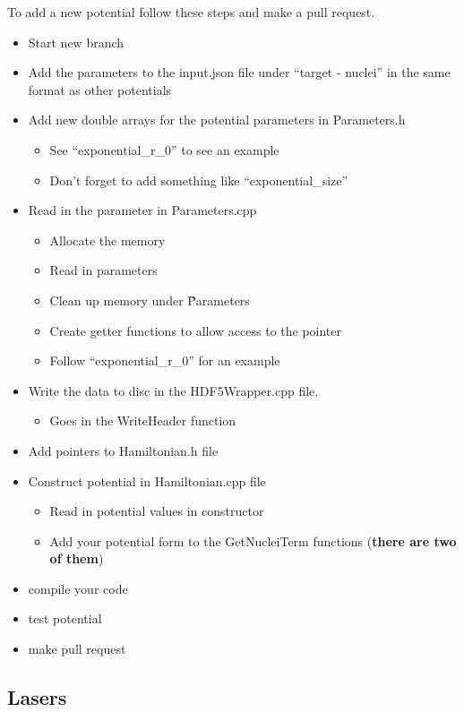 \documentclass{article}
\begin{document}
To add a new potential follow these steps and make a pull request.
\begin{itemize}
  \item Start new branch
  \item Add the parameters to the input.json file under ``target - nuclei'' in the same format as other potentials
  \item Add new double arrays for the potential parameters in Parameters.h
  \begin{itemize}
    \item See ``exponential\_r\_0'' to see an example
    \item Don't forget to add something like ``exponential\_size''
  \end{itemize}
  \item Read in the parameter in Parameters.cpp
  \begin{itemize}
    \item Allocate the memory
    \item Read in parameters
    \item Clean up memory under \~Parameters
    \item Create getter functions to allow access to the pointer
    \item Follow ``exponential\_r\_0'' for an example
  \end{itemize}
  \item Write the data to disc in the HDF5Wrapper.cpp file.
  \begin{itemize}
    \item Goes in the WriteHeader function
  \end{itemize}
  \item Add pointers to Hamiltonian.h file
  \item Construct potential in Hamiltonian.cpp file
  \begin{itemize}
    \item Read in potential values in constructor
    \item Add your potential form to the GetNucleiTerm functions (\textbf{there are two of them})
  \end{itemize}
  \item compile your code
  \item test potential
  \item make pull request
\end{itemize}

\subsection{Lasers} %
\label{sub:lasers}
\end{document}
